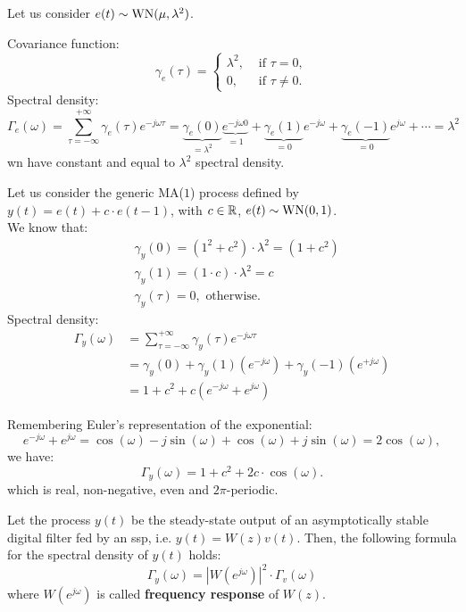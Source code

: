 \begin{exa}
	Let us consider $e(t) \sim \operatorname{WN}(\mu, \lambda^{2})$.

	Covariance function:
	\[
		\gamma_{e}(\tau) =
		\begin{cases}
			\lambda^{2}, & \text { if } \tau=0, \\
			0, & \text { if } \tau \neq 0.
		\end{cases}
	\]
	Spectral density:
	\[
		\Gamma_{e}(\omega) =\sum_{\tau=-\infty}^{+\infty} \gamma_{e}(\tau) e^{-j \omega \tau}=\underbrace{\gamma_{e}(0)}_{=\lambda^2} \underbrace{e^{-j \omega 0}}_{=1}+\underbrace{\gamma_{e}(1)}_{=0} e^{-j \omega} + \underbrace{\gamma_{e}(-1)}_{=0} e^{j \omega}+\cdots = \lambda^{2}
	\]
	\gls{wn} have constant and equal to $\lambda^{2}$ spectral density.
\end{exa}
\newpage
\begin{exa}
Let us consider the generic MA($1$) process defined by $y(t)=e(t)+c \cdot e(t-1)$, with $c \in \mathbb{R}$, $e(t)\sim \operatorname{WN}(0,1)$.\\
We know that:
\begin{align*}
	&\gamma_{y}(0)=(1^{2}+c^{2})\cdot \lambda^{2}=(1+c^{2})\\
	&\gamma_{y}(1)=(1 \cdot c) \cdot \lambda^{2}=c \\
	&\gamma_{y}(\tau)=0, \text{ otherwise.}
\end{align*}
Spectral density:
\begin{align*}
	\Gamma_{y}(\omega)&=\sum_{\tau=-\infty}^{+\infty} \gamma_{y}(\tau) e^{-j \omega \tau}\\
	&=\gamma_{y}(0)+\gamma_{y}(1)(e^{-j \omega})+\gamma_{y}(-1)(e^{+j \omega}) \\
	&=1+c^{2}+c(e^{-j \omega}+e^{j \omega})
\end{align*}

Remembering Euler's representation of the exponential:
$$
	e^{-j \omega}+e^{j \omega}=\cos (\omega)-j \sin (\omega)+\cos (\omega)+j \sin (\omega)=2 \cos (\omega),
$$
we have:
$$
	\Gamma_y(\omega)=1+c^{2}+2 c \cdot \cos (\omega).
$$
which is real, non-negative, even and $2 \pi$-periodic.
\end{exa}

\begin{thm}
    Let the process $y(t)$ be the steady-state output of an asymptotically stable digital filter fed by an \gls{ssp}, i.e. $y(t)=W(z) v(t)$. Then, the following formula for the spectral density of $y(t)$ holds:
\[
	\boxed{\Gamma_{y}(\omega)=\left|W(e^{j \omega})\right|^{2} \cdot \Gamma_{v}(\omega)}
\]
where $W(e^{j \omega})$ is called \textbf{frequency response} of $W(z)$.
\end{thm}

